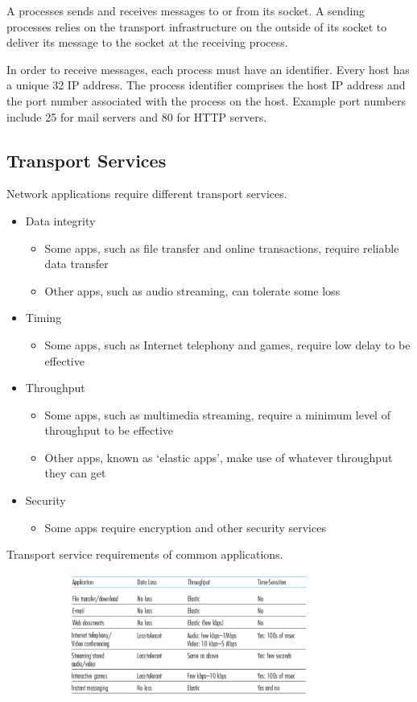 A processes sends and receives messages to or from its socket.
A sending processes relies on the transport infrastructure on the outside of its socket to deliver its message to the socket at the receiving process.

In order to receive messages, each process must have an identifier.
Every host has a unique \SI{32}{\bit} IP address.
The process identifier comprises the host IP address and the port number associated with the process on the host.
Example port numbers include \num{25} for mail servers and \num{80} for HTTP servers.

\subsection{Transport Services}

Network applications require different transport services.
\begin{itemize}
  \item Data integrity
  \begin{itemize}
    \item Some apps, such as file transfer and online transactions, require reliable data transfer
    \item Other apps, such as audio streaming, can tolerate some loss
  \end{itemize}
  \item Timing
  \begin{itemize}
    \item Some apps, such as Internet telephony and games, require low delay to be effective
  \end{itemize}
  \item Throughput
  \begin{itemize}
    \item Some apps, such as multimedia streaming, require a minimum level of throughput to be effective
    \item Other apps, known as `elastic apps', make use of whatever throughput they can get
  \end{itemize}
  \item Security
  \begin{itemize}
    \item Some apps require encryption and other security services
  \end{itemize}
\end{itemize}

\begin{table}[htp]
  \centering
  \caption*{Transport service requirements of common applications.}
  \includegraphics[width=12cm,height=4cm]{unit-17/figures/transport-service-requirements.png}
\end{table}

